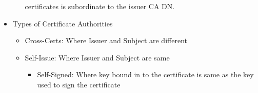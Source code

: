 \documentclass[12pt]{report}
\begin{document}
\begin{itemize}
\begin{itemize}
                        certificates is subordinate to the issuer CA DN.
                \end{itemize}
            \item Types of Certificate Authorities
                \begin{itemize}
                    \item Cross-Certs: Where Issuer and Subject are different
                    \item Self-Issue: Where Issuer and Subject are same
                        \begin{itemize}
                            \item Self-Signed: Where key bound in to the certificate is same as the key used to sign the certificate
                        \end{itemize}
                \end{itemize}
        \end{itemize}
\end{document}
